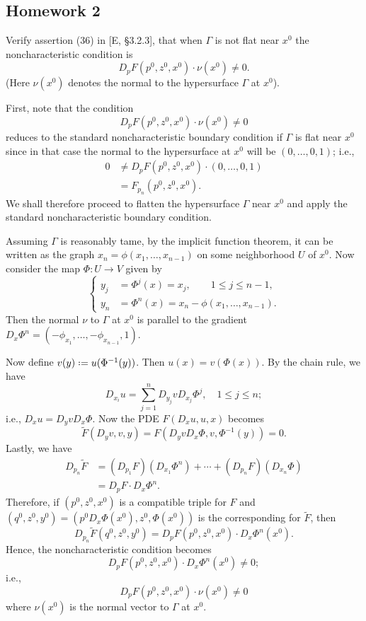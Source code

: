 \subsection{Homework 2}
\begin{problem}
  Verify assertion (36) in [E, \S 3.2.3], that when \(\Gamma\) is not flat
  near \(x^0\) the noncharacteristic condition is
  \[
    D_pF(p^0,z^0,x^0)\cdot \nu(x^0)\neq 0.
  \]
  (Here \(\nu(x^0)\) denotes the normal to the hypersurface \(\Gamma\) at
  \(x^0\)).
\end{problem}
\begin{solution*}
  First, note that the condition
  \[
    D_pF(p^0,z^0,x^0)\cdot \nu(x^0)\neq 0
  \]
  reduces to the standard noncharacteristic boundary condition if
  \(\Gamma\) is flat near \(x^0\) since in that case the normal to the
  hypersurface at \(x^0\) will be \((0,\dotsc,0,1)\); i.e.,
  \begin{align*}
    0&\neq D_pF(p^0,z^0,x^0)\cdot (0,\dotsc,0,1)\\
     &=F_{p_n}(p^0,z^0,x^0).
  \end{align*}
  We shall therefore proceed to flatten the hypersurface \(\Gamma\) near
  \(x^0\) and apply the standard noncharacteristic boundary condition.

  Assuming \(\Gamma\) is reasonably tame, by the implicit function theorem,
  it can be written as the graph \(x_n=\phi(x_1,\dotsc,x_{n-1})\) on some
  neighborhood \(U\) of \(x^0\). Now consider the map \(\Phi\colon U\to V\)
  given by
  \[
    \left\{
      \begin{aligned}
        y_j&=\Phi^j(x)=x_j,\qquad 1\leq j\leq n-1,\\
        y_n&=\Phi^n(x)=x_n-\phi(x_1,\dotsc,x_{n-1}).
      \end{aligned}
    \right.
  \]
  Then the normal \(\nu\) to \(\Gamma\) at \(x^0\) is parallel to the
  gradient \(D_x\Phi^n=(-\phi_{x_1},\dotsc,-\phi_{x_{n-1}},1)\).

  Now define \(v(y)\defeq u(\Phi^{-1}(y))\). Then \(u(x)=v(\Phi(x))\). By
  the chain rule, we have
  \[
    D_{x_i}u=\sum_{j=1}^n D_{y_j} vD_{x_j}\Phi^j,\quad 1\leq j\leq n;
  \]
  i.e., \(D_x u=D_y v D_x\Phi\). Now the PDE \(F(D_xu,u,x)\) becomes
  \[
    \tilde F(D_yv, v, y)=F(D_y vD_x\Phi,v,\Phi^{-1}(y))=0.
  \]
  Lastly, we have
  \begin{align*}
    D_{p_n}\tilde F
    &=(D_{p_1}F)(D_{x_1}\Phi^n)+\dotsb+(D_{p_n}F)(D_{x_n}\Phi)\\
    &=D_pF\cdot D_x\Phi^n.
  \end{align*}
  Therefore, if \((p^0,z^0,x^0)\) is a compatible triple for \(F\) and
  \((q^0,z^0,y^0)=(p^0D_x\Phi(x^0),z^0,\Phi(x^0))\) is the
  corresponding for \(\tilde F\), then
  \[
    D_{p_n}\tilde F(q^0,z^0,y^0)=D_pF(p^0,z^0,x^0)\cdot D_x\Phi^n(x^0).
  \]
  Hence, the noncharacteristic condition becomes
  \[
    D_p F(p^0,z^0,x^0)\cdot D_x\Phi^n(x^0)\neq 0;
  \]
  i.e.,
  \[
    D_p F(p^0,z^0,x^0)\cdot\nu(x^0)\neq 0
  \]
  where \(\nu(x^0)\) is the normal vector to \(\Gamma\) at \(x^0\).
\end{solution*}

